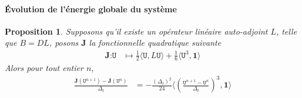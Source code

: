 \documentclass[12pt,a4paper]{article}
\newtheorem{prop}[dfn]{\textbf{Proposition}}
\numberwithin{equation}{section}
\begin{document}
\paragraph{Évolution de l'énergie globale du système}
\begin{prop}
    Supposons qu'il existe un opérateur linéaire auto-adjoint $L$, telle que  $B = DL$, posons $\textbf{J}$ la fonctionnelle quadratique suivante
    \begin{align*}
        \textbf{J} : \texttt{U} &\mapsto \frac{1}{2}\langle \texttt{U},L\texttt{U} \rangle + \frac{1}{6}\langle \texttt{U}^3,\textbf{1} \rangle
\end{align*}
    Alors pour tout entier $n$, 
    \begin{equation*}
        \begin{aligned}
        \frac{\textbf{J}(\texttt{U}^{n+1}) -\textbf{J}(\texttt{U}^{n})}{\Delta_t} & = - \frac{(\Delta_t)^2}{24}\langle\left(\frac{\texttt{U}^{n+1} - \texttt{U}^{n}}{\Delta_t}\right)^3, \textbf{1}\rangle \\
        \end{aligned}
    \end{equation*}
\end{prop}
\end{document}
